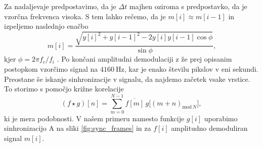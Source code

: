 \documentclass{article}
\begin{document}
Za nadaljevaje predpostavimo, da je $\Delta t$ majhen oziroma s predpostavko, da je vzorčna frekvenca visoka. S tem lahko rečemo, da je $m[i] \approx m[i-1]$ in izpeljemo naslednjo enačbo 
\begin{equation*}
	m[i] = \frac{\sqrt{y[i]^2 + y[i-1]^2-2y[i]y[i-1]\cos{\phi}}}{\sin{\phi}}\text{,}
\end{equation*}
kjer $\phi = 2\pi f_c/f_i$ \cite{bernardi}. Po končani amplitudni demodulaciji z že prej opisanim postopkom vzorčimo signal na $\SI{4160}{\hertz}$, kar je enako številu pikslov v eni sekundi.
Preostane še iskanje sinhronizacije v signalu, da najdemo začetek vsake vrstice. To storimo s pomočjo križne korelacije
\begin{equation*}
	(f \star g)[n] = \sum_{m=0}^{N-1} \overline{f[m]} \, g\bigl[(m+n)_{\text{mod}\, N}\bigr],
\end{equation*}
 ki je mera podobnosti. V našem primeru namesto funkcije $g[i]$ uporabimo sinhronizacijo A na sliki \ref{fig:sync_frames} in za $f[i]$ amplitudno demoduliran signal $m[i]$.
\end{document}
